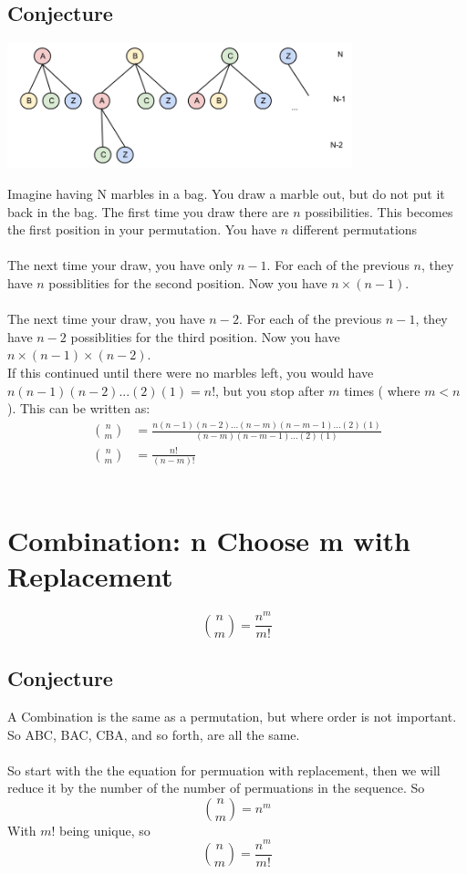 \subsection{Conjecture}
\begin{center}
\includegraphics[width=10cm]{Combinatorics/permutations_diag2}
\end{center}
Imagine having N marbles in a bag.  You draw a marble out, but do not put it back in the bag.  The first time you draw there are \(n\) possibilities.  This becomes the first position in your permutation. You have \(n\) different permutations\\
\\
The next time your draw, you have only \(n-1\).  For each of the previous \(n\), they have \(n\) possiblities for the second position.  Now you have \(n\times (n-1)\). \\
\\
The next time your draw, you have \(n-2\).  For each of the previous \(n-1\), they have \(n-2\) possiblities for the third position.  Now you have \(n\times (n-1) \times (n-2) \). \\
If this continued until there were no marbles left, you would have \(n(n-1)(n-2)...(2)(1) = n!\), but you stop after \(m\) times ( where \(m<n\)).  This can be written as:\\
\begin{align*}
{n \choose m} &= \frac{n(n-1)(n-2)...(n-m)(n-m-1)...(2)(1)}{(n-m)(n-m-1)...(2)(1)}\\
{n \choose m} &= \frac{n!}{(n-m)!}
\end{align*}
\\
\section{ Combination: n Choose m with Replacement}
\[{n \choose m} = \frac{n^m}{m!}\]

\subsection{Conjecture}
A Combination is the same as a permutation, but where order is not important.  So ABC, BAC, CBA, and so forth, are all the same.\\
\\
So start with the the equation for permuation with replacement, then we will reduce it by the number of the number of permuations in the sequence. So\\
\[{n \choose m} = n^m\]
With \(m!\) being unique, so\\
\[{n \choose m} = \frac{n^m}{m!}\]


